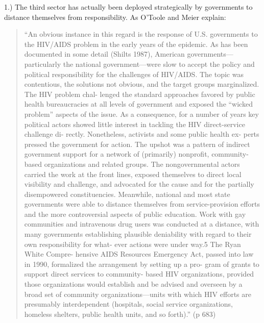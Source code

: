 \documentclass[12pt,book]{article}
\begin{document}
1.) The third sector has actually been deployed strategically by
governments to distance themselves from responsibility. As O'Toole and
Meier explain:

\begin{quote}
``An obvious instance in this regard is the response of U.S. governments
to the HIV/AIDS problem in the early years of the epidemic. As has been
documented in some detail (Shilts 1987), American
governments---particularly the national government---were slow to accept
the policy and political responsibility for the challenges of HIV/AIDS.
The topic was contentious, the solutions not obvious, and the target
groups marginalized. The HIV problem chal- lenged the standard
approaches favored by public health bureaucracies at all levels of
government and exposed the ``wicked problem'' aspects of the issue. As a
consequence, for a number of years key political actors showed little
interest in tackling the HIV direct-service challenge di- rectly.
Nonetheless, activists and some public health ex- perts pressed the
government for action. The upshot was a pattern of indirect government
support for a network of (primarily) nonprofit, community-based
organizations and related groups. The nongovernmental actors carried the
work at the front lines, exposed themselves to direct local visibility
and challenge, and advocated for the cause and for the partially
disempowered constituencies. Meanwhile, national and most state
governments were able to distance themselves from service-provision
efforts and the more controversial aspects of public education. Work
with gay communities and intravenous drug users was conducted at a
distance, with many governments establishing plausible deniability with
regard to their own responsibility for what- ever actions were under
way.5 The Ryan White Compre- hensive AIDS Resources Emergency Act,
passed into law in 1990, formalized the arrangement by setting up a pro-
gram of grants to support direct services to community- based HIV
organizations, provided those organizations would establish and be
advised and overseen by a broad set of community organizations---units
with which HIV efforts are presumably interdependent (hospitals, social
service organizations, homeless shelters, public health units, and so
forth).'' (p 683)
\end{quote}
\end{document}
